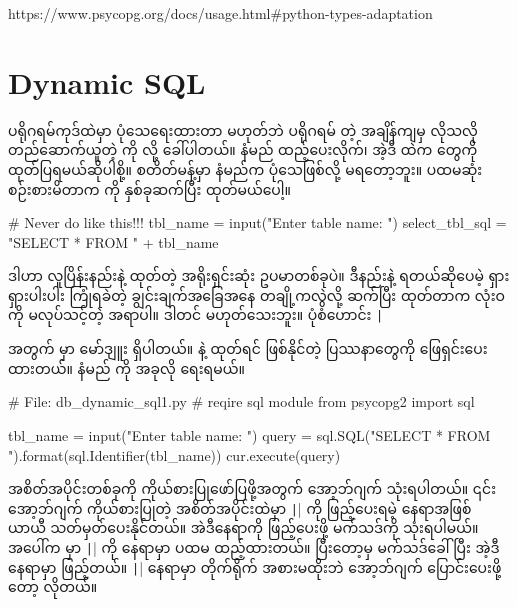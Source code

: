\begin{vbtm}
https://www.psycopg.org/docs/usage.html#python-types-adaptation
\end{vbtm}

\section{Dynamic SQL}
ပရိုဂရမ်ကုဒ်ထဲမှာ ပုံသေရေးထားတာ မဟုတ်ဘဲ ပရိုဂရမ်  တဲ့ အချိန်ကျမှ လိုသလို တည်ဆောက်ယူတဲ့  ကို  လို့ ခေါ်ပါတယ်။  နံမည် ထည့်ပေးလိုက်၊ အဲ့ဒီ  ထဲက  တွေကို ထုတ်ပြရမယ်ဆိုပါစို့။  စတိတ်မန့်မှာ  နံမည်က ပုံသေဖြစ်လို့ မရတော့ဘူး။ ပထမဆုံး စဉ်းစားမိတာက  ကို  နှစ်ခုဆက်ပြီး ထုတ်မယ်ပေါ့။
%
\begin{py}
# Never do like this!!!
tbl_name = input("Enter table name: ")
select_tbl_sql = "SELECT * FROM " + tbl_name 
\end{py}
%
ဒါဟာ လူပြိန်းနည်းနဲ့  ထုတ်တဲ့ အရိုးရှင်းဆုံး ဥပမာတစ်ခုပဲ။ ဒီနည်းနဲ့ ရတယ်ဆိုပေမဲ့ ရှားရှားပါးပါး ကြုံရခဲတဲ့ ချွင်းချက်အခြေအနေ တချို့ကလွဲလို့  ဆက်ပြီး  ထုတ်တာက လုံးဝကို မလုပ်သင့်တဲ့ အရာပါ။ ဒါတင် မဟုတ်သေးဘူး။ \fEn{,} \fEn{,} \fEn{,} ပုံစံဟောင်း \texttt|%


 အတွက်  မှာ  မော်ဒျူး ရှိပါတယ်။  နဲ့  ထုတ်ရင် ဖြစ်နိုင်တဲ့ ပြဿနာတွေကို ဖြေရှင်းပေးထားတယ်။  နံမည်  ကို အခုလို ရေးရမယ်။
%
\begin{py}
# File: db_dynamic_sql1.py   
# reqire sql module
from psycopg2 import sql

tbl_name = input("Enter table name: ")
query = sql.SQL("SELECT * FROM {}").format(sql.Identifier(tbl_name))
cur.execute(query)
\end{py}
%
 အစိတ်အပိုင်းတစ်ခုကို ကိုယ်စားပြုဖော်ပြဖို့အတွက်  အော့ဘ်ဂျက် သုံးရပါတယ်။ ၎င်းအော့ဘ်ဂျက် ကိုယ်စားပြုတဲ့  အစိတ်အပိုင်းထဲမှာ \texttt|{}| ကို ဖြည့်ပေးရမဲ့ နေရာအဖြစ် ယာယီ သတ်မှတ်ပေးနိုင်တယ်။ အဲဒီနေရာကို ဖြည့်ပေးဖို့  မက်သဒ်ကို သုံးရပါမယ်။ အပေါ်က   မှာ \texttt|{}| ကို  နေရာမှာ ပထမ ထည့်ထားတယ်။ ပြီးတော့မှ  မက်သဒ်ခေါ်ပြီး အဲ့ဒီနေရာမှာ  ဖြည့်တယ်။ \texttt|{}| နေရာမှာ  တိုက်ရိုက် အစားမထိုးဘဲ  အော့ဘ်ဂျက် ပြောင်းပေးဖို့တော့ လိုတယ်။

